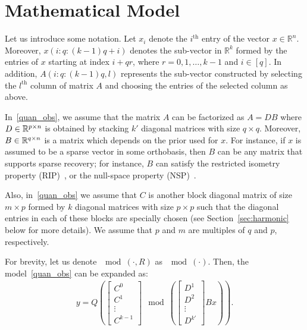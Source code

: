 \section{Mathematical Model}
\label{sec:Model}
\vspace{-0.2em} %
Let us introduce some notation. Let $x_i$ denote the $i^{\mathrm{th}}$ entry of the vector $x\in\mathbb{R}^n$. Moreover, $x(i:q:(k-1)q+i)$ denotes the sub-vector in $\mathbb{R}^k$ formed by the entries of $x$ starting at index $i + qr$, where $r = 0, 1, \ldots, k-1$ and $i \in [q]$. In addition, $A(i:q:(k-1)q,l)$ represents the sub-vector constructed by selecting the $l^{\mathrm{th}}$ column of matrix $A$ and choosing the entries of the selected column as above. 


In~\eqref{quan_obs}, we assume that the matrix $A$ can be factorized as $A=DB$ where $D\in{\mathbb{R}}^{p\times n}$ is obtained by stacking $k'$ diagonal matrices with size $q\times q$. Moreover, $B\in{\mathbb{R}}^{q\times n}$ is a matrix which depends on the prior used for $x$. For instance, if $x$ is assumed to be a sparse vector in some orthobasis, then $B$ can be any matrix that supports sparse recovery; for instance, $B$ can satisfy the restricted isometry property (RIP)~\cite{CandesRIP}, or the null-space property (NSP)~\cite{foucart2013}. 

Also, in~\eqref{quan_obs} we assume that $C$ is another block diagonal matrix of size $m\times p$ formed by $k$ diagonal matrices with size $p\times p$ such that the diagonal entries in each of these blocks are specially chosen (see Section~\ref{sec:harmonic} below for more details). We assume that $p$ and $m$ are multiples of $q$ and $p$, respectively. 

For brevity, let us denote $\mod(\cdot,R)$ as $\mod(\cdot)$. Then, the model~\eqref{quan_obs} can be expanded as:
\begin{align}\label{Mainmodel}
y = Q\left(
\begin{bmatrix}
C^0 \\
C^1 \\
\vdots  \\
C^{k-1}
\end{bmatrix}
\mod\left(
\begin{bmatrix}
D^1 \\
D^2 \\
 \vdots  \\
D^{k'}
\end{bmatrix}
Bx
\right)\right) .
\end{align}

